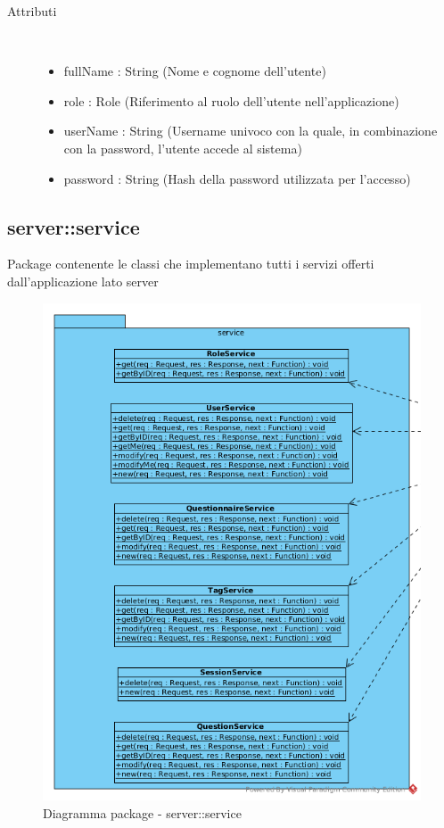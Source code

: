 \begin{description}
\item[Attributi] \hfill \\
 \vspace{-7mm}
\begin{itemize}
\item fullName : String (Nome e cognome dell'utente)
\item role : Role (Riferimento al ruolo dell'utente nell'applicazione)
\item userName : String (Username univoco con la quale, in combinazione con la password, l'utente accede al sistema)
\item password : String (Hash della password utilizzata per l'accesso)
\end{itemize}

\end{description}

\vspace{0.5cm}
\subsection{server::service}
Package contenente le classi che implementano tutti i servizi offerti dall'applicazione lato server\begin{center}
		\begin{figure}[H]
			\centering \includegraphics[scale=4, max width=\textwidth, max height=\myheight]{../img/diagrammiClassi/server/service.png}
			\caption{Diagramma package - server::service}
		\end{figure}
	\end{center}\hypertarget{server::service::UserService}{}
